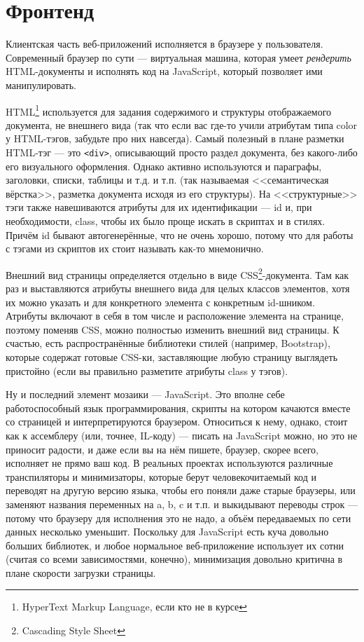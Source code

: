 \documentclass[a5paper]{article}
\begin{document}
\section{Фронтенд}

Клиентская часть веб-приложений исполняется в браузере у пользователя. Современный браузер по сути --- виртуальная машина, которая умеет \emph{рендерить} HTML-документы и исполнять код на JavaScript, который позволяет ими манипулировать. 

HTML\footnote{HyperText Markup Language, если кто не в курсе} используется для задания содержимого и структуры отображаемого документа, не внешнего вида (так что если вас где-то учили атрибутам типа color у HTML-тэгов, забудьте про них навсегда). Самый полезный в плане разметки HTML-тэг --- это \texttt{<div>}, описывающий просто раздел документа, без какого-либо его визуального оформления. Однако активно используются и параграфы, заголовки, списки, таблицы и т.д. и т.п. (так называемая <<семантическая вёрстка>>, разметка документа исходя из его структуры). На <<структурные>> тэги также навешиваются атрибуты для их идентификации --- id и, при необходимости, class, чтобы их было проще искать в скриптах и в стилях. Причём id бывают автогенерённые, что не очень хорошо, потому что для работы с тэгами из скриптов их стоит называть как-то мнемонично.

Внешний вид страницы определяется отдельно в виде CSS\footnote{Cascading Style Sheet}-документа. Там как раз и выставляются атрибуты внешнего вида для целых классов элементов, хотя их можно указать и для конкретного элемента с конкретным id-шником. Атрибуты включают в себя в том числе и расположение элемента на странице, поэтому поменяв CSS, можно полностью изменить внешний вид страницы. К счастью, есть распространённые библиотеки стилей (например, Bootstrap), которые содержат готовые CSS-ки, заставляющие любую страницу выглядеть пристойно (если вы правильно разметите атрибуты class у тэгов).

Ну и последний элемент мозаики --- JavaScript. Это вполне себе работоспособный язык программирования, скрипты на котором качаются вместе со страницей и интерпретируются браузером. Относиться к нему, однако, стоит как к ассемблеру (или, точнее, IL-коду) --- писать на JavaScript можно, но это не приносит радости, и даже если вы на нём пишете, браузер, скорее всего, исполняет не прямо ваш код. В реальных проектах используются различные транспиляторы и минимизаторы, которые берут человекочитаемый код и переводят на другую версию языка, чтобы его поняли даже старые браузеры, или заменяют названия переменных на a, b, c и т.п. и выкидывают переводы строк --- потому что браузеру для исполнения это не надо, а объём передаваемых по сети данных несколько уменьшит. Поскольку для JavaScript есть куча довольно больших библиотек, и любое нормальное веб-приложение использует их сотни (считая со всеми зависимостями, конечно), минимизация довольно критична в плане скорости загрузки страницы.
\end{document}
